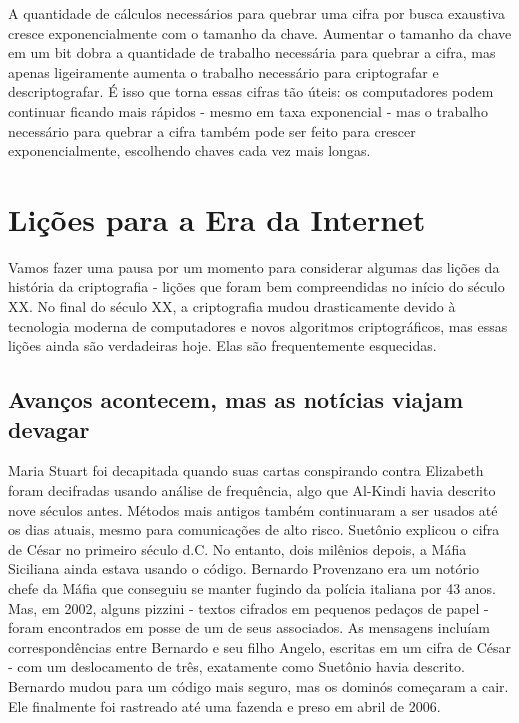 \documentclass{book}
\begin{document}
A quantidade de cálculos necessários para quebrar uma cifra por busca exaustiva cresce exponencialmente com o tamanho da chave. Aumentar o tamanho da chave em um bit dobra a quantidade de trabalho necessária para quebrar a cifra, mas apenas ligeiramente aumenta o trabalho necessário para criptografar e descriptografar. É isso que torna essas cifras tão úteis: os computadores podem continuar ficando mais rápidos - mesmo em taxa exponencial - mas o trabalho necessário para quebrar a cifra também pode ser feito para crescer exponencialmente, escolhendo chaves cada vez mais longas.


\section{Lições para a Era da Internet}
\label{segredos:licoes}

Vamos fazer uma pausa por um momento para considerar algumas das lições da história da criptografia - lições que foram bem compreendidas no início do século XX. No final do século XX, a criptografia mudou drasticamente devido à tecnologia moderna de computadores e novos algoritmos criptográficos, mas essas lições ainda são verdadeiras hoje. Elas são frequentemente esquecidas.

\subsection{Avanços acontecem, mas as notícias viajam devagar}
\label{segredos:avancos}

Maria Stuart foi decapitada quando suas cartas conspirando contra Elizabeth foram decifradas usando análise de frequência, algo que Al-Kindi havia descrito nove séculos antes. Métodos mais antigos também continuaram a ser usados até os dias atuais, mesmo para comunicações de alto risco. Suetônio explicou o cifra de César no primeiro século d.C. No entanto, dois milênios depois, a Máfia Siciliana ainda estava usando o código. Bernardo Provenzano era um notório chefe da Máfia que conseguiu se manter fugindo da polícia italiana por 43 anos. Mas, em 2002, alguns pizzini - textos cifrados em pequenos pedaços de papel - foram encontrados em posse de um de seus associados. As mensagens incluíam correspondências entre Bernardo e seu filho Angelo, escritas em um cifra de César - com um deslocamento de três, exatamente como Suetônio havia descrito. Bernardo mudou para um código mais seguro, mas os dominós começaram a cair. Ele finalmente foi rastreado até uma fazenda e preso em abril de 2006.
\end{document}
